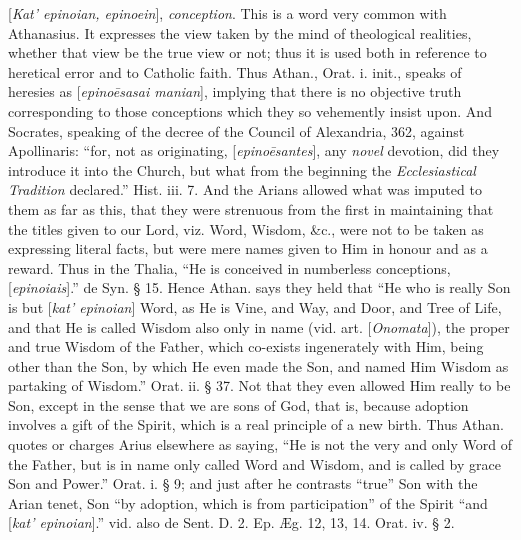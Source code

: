 [\emph{Kat'
epinoian, epinoein}], \emph{conception}. This is a word very
common with Athanasius. It expresses the view taken by the mind of
theological realities, whether that view be the true view or not; thus
it is used both in reference to heretical error and to Catholic faith.
Thus Athan., Orat. i. init., speaks of heresies as [\emph{epino\={e}sasai
manian}], implying that there is no objective truth corresponding
to those conceptions which they so vehemently insist upon. And
Socrates, speaking of the decree of the Council of Alexandria, 362,
against Apollinaris: “for, not as originating, [\emph{epino\={e}santes}],
any \emph{novel} devotion, did they introduce it into the Church, but
what from the beginning the \emph{Ecclesiastical Tradition}
declared.” Hist. iii. 7. And the Arians allowed what was imputed to
them as far as this, that they were strenuous from the first in
maintaining that the titles given to our Lord, viz. Word, Wisdom,
\&c., were not to be taken as expressing literal facts, but were
mere names given to Him in honour and as a reward. Thus in the Thalia,
“He is conceived in numberless conceptions, [\emph{epinoiais}].”
de Syn. § 15. Hence Athan. says they held that “He who is really
Son is but [\emph{kat'
epinoian}] Word, as He is Vine, and Way, and Door, and Tree
of Life, and that He is called Wisdom also only in name (vid. art. [\emph{Onomata}]),
the proper and true Wisdom of the Father, which co-exists
ingenerately with Him, being other than the Son, by which He even made
the Son, and named Him Wisdom as partaking of Wisdom.” Orat. ii. §
37. Not that they even allowed Him really to be Son, except in the
sense that we are sons of God, that is, because adoption involves a
gift of the Spirit, which is a real principle of a new birth. Thus
Athan. quotes or charges Arius elsewhere as saying, “He is not the
very and only Word of the Father, but is in name only called Word and
Wisdom, and is called by grace Son and Power.” Orat. i. § 9; and
just after he contrasts “true” Son with the Arian tenet, Son “by
adoption, which is from participation” of the Spirit “and [\emph{kat'
epinoian}].” vid. also de Sent. D. 2. Ep. Æg. 12, 13, 14.
Orat. iv. § 2.


